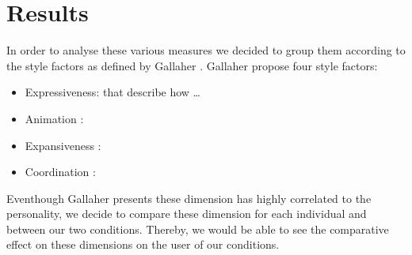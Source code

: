 \section{Results}
\label{sec:results}
In order to analyse these various measures we decided to group them according to the style factors as defined by Gallaher \cite{Gallaher1992}. 
Gallaher propose four style factors: 
\begin{itemize}
\item Expressiveness: that describe how \dots
\item Animation :
\item Expansiveness : 
\item Coordination : 
\end{itemize}
Eventhough Gallaher presents these dimension has highly correlated to the personality, we decide to compare these dimension for each individual and between our two conditions. 
Thereby, we would be able to see the comparative effect on these dimensions on the user of our conditions. 

